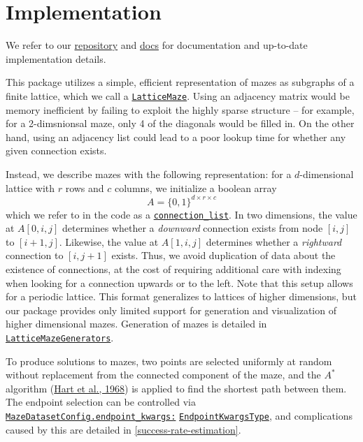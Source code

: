 \documentclass[10pt,a4paper,onecolumn]{article}
\begin{document}
\hypertarget{implementation}{%
\section{Implementation}\label{implementation}}

We refer to our
\href{https://github.com/understanding-search/maze-dataset}{repository}
and
\href{https://understanding-search.github.io/maze-dataset/maze_dataset.html}{docs}
for documentation and up-to-date implementation details.

This package utilizes a simple, efficient representation of mazes as
subgraphs of a finite lattice, which we call a
\href{https://understanding-search.github.io/maze-dataset/maze_dataset.html\#LatticeMaze}{\texttt{LatticeMaze}}.
Using an adjacency matrix would be memory inefficient by failing to
exploit the highly sparse structure -- for example, for a 2-dimsnionsal
maze, only 4 of the diagonals would be filled in. On the other hand,
using an adjacency list could lead to a poor lookup time for whether any
given connection exists.

Instead, we describe mazes with the following representation: for a
\(d\)-dimensional lattice with \(r\) rows and \(c\) columns, we
initialize a boolean array \[
  A = \{0, 1\}^{d \times r \times c}
\] which we refer to in the code as a
\href{https://understanding-search.github.io/maze-dataset/maze_dataset.html\#LatticeMaze.connection_list}{\texttt{connection\_list}}.
In two dimensions, the value at \(A[0,i,j]\) determines whether a
\emph{downward} connection exists from node \([i,j]\) to \([i+1, j]\).
Likewise, the value at \(A[1,i,j]\) determines whether a
\emph{rightward} connection to \([i, j+1]\) exists. Thus, we avoid
duplication of data about the existence of connections, at the cost of
requiring additional care with indexing when looking for a connection
upwards or to the left. Note that this setup allows for a periodic
lattice. This format generalizes to lattices of higher dimensions, but
our package provides only limited support for generation and
visualization of higher dimensional mazes. Generation of mazes is
detailed in
\href{https://understanding-search.github.io/maze-dataset/maze_dataset.html\#LatticeMazeGenerators}{\texttt{LatticeMazeGenerators}}.

To produce solutions to mazes, two points are selected uniformly at
random without replacement from the connected component of the maze, and
the \(A^*\) algorithm (\protect\hyperlink{ref-A_star}{Hart et al.,
1968}) is applied to find the shortest path between them. The endpoint
selection can be controlled via
\href{https://understanding-search.github.io/maze-dataset/maze_dataset/dataset/maze_dataset_config.html\#MazeDatasetConfig.endpoint_kwargs}{\texttt{MazeDatasetConfig.endpoint\_kwargs:}}
\href{https://understanding-search.github.io/maze-dataset/maze_dataset/dataset/maze_dataset_config.html\#EndpointKwargsType}{\texttt{EndpointKwargsType}},
and complications caused by this are detailed in
\autoref{success-rate-estimation}.
\end{document}
